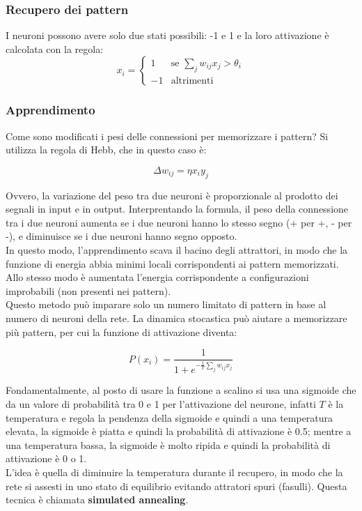 \subsubsection{Recupero dei pattern}
I neuroni possono avere solo due stati possibili: -1 e 1 e la loro attivazione è
calcolata con la regola:
\begin{equation*}
	x_i = \begin{cases}
		1 & \text{se } \sum_{j} w_{ij} x_j > \theta_i\\
		-1 & \text{altrimenti}
	\end{cases}
\end{equation*}

\subsubsection{Apprendimento}

Come sono modificati i pesi delle connessioni per memorizzare i pattern? Si
utilizza la regola di Hebb, che in questo caso è:

\begin{equation*}
	\Delta w_{ij} = \eta x_i y_j
\end{equation*}

Ovvero, la variazione del peso tra due neuroni è proporzionale al prodotto dei 
segnali in input e in output. Interprentando la formula, il peso della
connessione tra i due neuroni aumenta se i due neuroni hanno lo stesso segno (+
per +, - per -), e diminuisce se i due neuroni hanno segno opposto.\\
In questo modo, l'apprendimento scava il bacino degli attrattori, in modo che
la funzione di energia abbia minimi locali corrispondenti ai pattern memorizzati.
Allo stesso modo è aumentata l'energia corrispondente a configurazioni
improbabili (non presenti nei pattern).\\
Questo metodo può imparare solo un numero limitato di pattern in base al numero
di neuroni della rete. La dinamica stocastica può aiutare a memorizzare più
pattern, per cui la funzione di attivazione diventa:

\begin{equation*}
	P(x_i) = \frac{1}{1 + e^{-\frac{1}{T} \sum_{j} w_{ij} x_j}}
\end{equation*}

Fondamentalmente, al posto di usare la funzione a scalino si usa una sigmoide
che da un valore di probabilità tra 0 e 1 per l'attivazione del neurone, infatti
$T$ è la temperatura e regola la pendenza della sigmoide e quindi a una
temperatura elevata, la sigmoide è piatta e quindi la probabilità di attivazione
è 0.5; mentre a una temperatura bassa, la sigmoide è molto ripida e quindi la
probabilità di attivazione è 0 o 1.\\
L'idea è quella di diminuire la temperatura durante il recupero, in modo che la
rete si assesti in uno stato di equilibrio evitando attratori spuri (fasulli).
Questa tecnica è chiamata \textbf{simulated annealing}.

